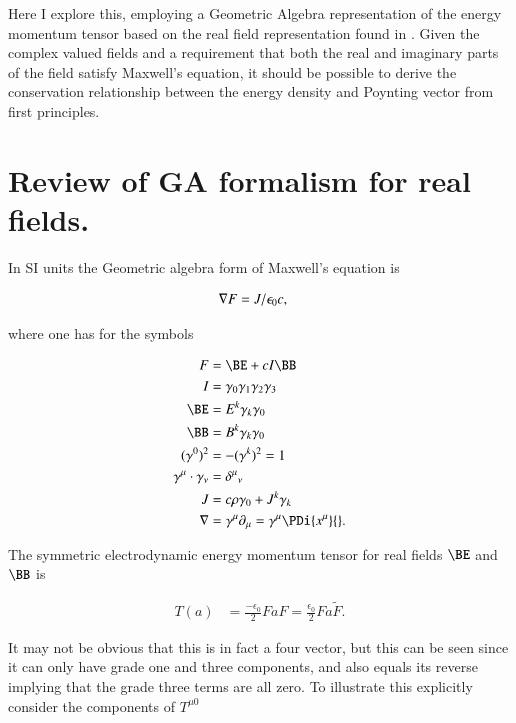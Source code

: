 Here I explore this, employing a Geometric Algebra representation of the energy momentum tensor based on the real field representation found in \citep{doran2003gap}.  Given the complex valued fields and a requirement that both the real and imaginary parts of the field satisfy Maxwell's equation, it should be possible to derive the conservation relationship between the energy density and Poynting vector from first principles.

\section{Review of GA formalism for real fields.}

In SI units the Geometric algebra form of Maxwell's equation is

\begin{align}
\label{eqn:complexFieldEnergy:4}
\nabla F &= J/\epsilon_0 c,
\end{align}

where one has for the symbols

\begin{subequations}
\begin{align}
\label{eqn:complexFieldEnergy:5}
F &= \BE + c I \BB \\
I &= \gamma_0 \gamma_1 \gamma_2 \gamma_3 \\
\BE &= E^k \gamma_k \gamma_0  \\
\BB &= B^k \gamma_k \gamma_0  \\
(\gamma^0)^2 &= -(\gamma^k)^2 = 1 \\
\gamma^\mu \cdot \gamma_\nu &= {\delta^\mu}_\nu \\
J &= c \rho \gamma_0 + J^k \gamma_k \\
\grad &= \gamma^\mu \partial_\mu = \gamma^\mu \PDi{x^\mu}{}.
\end{align}
\end{subequations}

The symmetric electrodynamic energy momentum tensor for real fields $\BE$ and $\BB$ is

\begin{align}\label{eqn:complexFieldEnergy:6}
T(a) &= \frac{-\epsilon_0}{2} F a F = \frac{\epsilon_0}{2} F a \tilde{F}.
\end{align}

It may not be obvious that this is in fact a four vector, but this can be seen since it can only have grade one and three components, and also equals its reverse implying that the grade three terms are all zero.  To illustrate this explicitly consider the components of $T^{\mu 0}$

